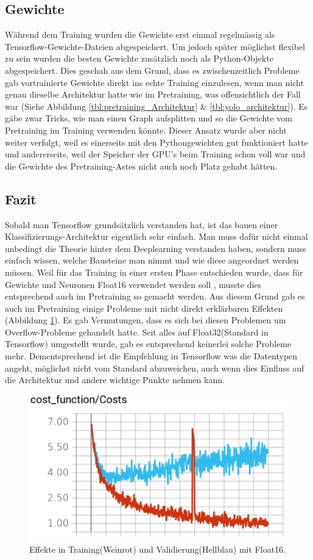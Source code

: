 \subsection{Gewichte}
Während dem Training wurden die Gewichte erst einmal regelmässig als Tensorflow-Gewichte-Dateien abgespeichert.
Um jedoch später möglichst flexibel zu sein wurden die besten Gewichte zusätzlich noch als Python-Objekte abgespeichert.
Dies geschah aus dem Grund, dass es zwischenzeitlich Probleme gab vortrainierte Gewichte direkt ins echte Training einzulesen, wenn man nicht genau dieselbe Architektur hatte wie im Pretraining, was offensichtlich der Fall war (Siehe Abbildung \ref{tbl:pretraining_Architektur} \& \ref{tbl:yolo_architektur}).
Es gäbe zwar Tricks, wie man einen Graph aufsplitten und so die Gewichte vom Pretraining im Training verwenden könnte. 
Dieser Ansatz wurde aber nicht weiter verfolgt, weil es einerseits mit den Pythongewichten gut funktioniert hatte und andererseits, weil der Speicher der GPU's beim Training schon voll war und die Gewichte des Pretraining-Astes nicht auch noch Platz gehabt hätten.

\subsection{Fazit}
Sobald man Tensorflow grundsätzlich verstanden hat, ist das bauen einer Klassifizierungs-Architektur eigentlich sehr einfach. 
Man muss dafür nicht einmal unbedingt die Theorie hinter dem Deeplearning verstanden haben, sondern muss einfach wissen, welche Bausteine \grqq{}man\grqq{} nimmt und wie diese angeordnet werden müssen.
Weil für das Training in einer ersten Phase entschieden wurde, dass für Gewichte und Neuronen Float16 verwendet werden soll , musste dies entsprechend auch im Pretraining so gemacht werden. 
Aus diesem Grund gab es auch im Pretraining einige Probleme mit nicht direkt erklärbaren Effekten (Abbildung \ref{img:overflow_pretraining}).
Es gab Vermutungen, dass es sich bei diesen Problemen um Overflow-Probleme gehandelt hatte.
Seit alles auf Float32(Standard in Tensorflow) umgestellt wurde, gab es entsprechend keinerlei solche Probleme mehr.
Dementsprechend ist die Empfehlung in Tensorflow was die Datentypen angeht, möglichst nicht vom Standard abzuweichen, auch wenn dies Einfluss auf die Architektur und andere wichtige Punkte nehmen kann.
\begin{figure}
	\centering
	\includegraphics[width=.7\textwidth]{Kapitel/20Pretraining/Bilder/Overflow.pdf}
	\caption{Effekte in Training(Weinrot) und Validierung(Hellblau) mit Float16.}
	\label{img:overflow_pretraining}
\end{figure}  
 